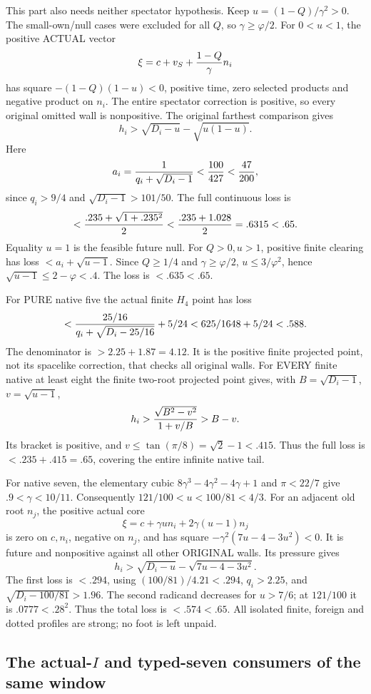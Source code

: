 \documentclass[11pt]{article}
\begin{document}
This part also needs neither spectator
hypothesis.  Keep
\(u=(1-Q)/\gamma^2>0\).
The small-own/null cases were excluded for
all \(Q\), so \(\gamma\ge\varphi/2\).
For \(0<u<1\), the positive ACTUAL vector
\[
        \xi=c+v_S+{1-Q\over\gamma}n_i
\]
has square \(-(1-Q)(1-u)<0\), positive
time, zero selected products and negative
product on \(n_i\).
The entire spectator correction is positive,
so every original omitted wall is nonpositive.
The original farthest comparison gives
\[
 h_i>\sqrt{D_i-u}-\sqrt{u(1-u)} .
\]
Here
\[
 a_i={1\over q_i+\sqrt{D_i-1}}<{100\over427}<{47\over200},
\]
since \(q_i>9/4\) and
\(\sqrt{D_i-1}>101/50\).
The full continuous loss is
\[
 <{.235+\sqrt{1+.235^2}\over2}
 <{.235+1.028\over2}=.6315<.65 .
\]
Equality \(u=1\) is the feasible future null.
For \(Q>0,u>1\), positive finite clearing
has loss \(<a_i+\sqrt{u-1}\).
Since \(Q\ge1/4\) and \(\gamma\ge\varphi/2\),
\(u\le3/\varphi^2\), hence
\(\sqrt{u-1}\le2-\varphi<.4\).
The loss is \(<.635<.65\).

For PURE native five the actual finite
\(H_4\) point has loss
\[
 <{25/16\over q_i+\sqrt{D_i-25/16}}+5/24
              <625/1648+5/24<.588 .
\]
The denominator is \(>2.25+1.87=4.12\).
It is the positive finite projected point,
not its spacelike correction, that checks
all original walls.
For EVERY finite native at least eight
the finite two-root projected point gives,
with \(B=\sqrt{D_i-1}\), \(v=\sqrt{u-1}\),
\[
 h_i>{\sqrt{B^2-v^2}\over1+v/B}>B-v .
\]
Its bracket is positive, and
\(v\le\tan(\pi/8)=\sqrt2-1<.415\).
Thus the full loss is \(<.235+.415=.65\),
covering the entire infinite native tail.

For native seven, the elementary cubic
\(8\gamma^3-4\gamma^2-4\gamma+1\) and
\(\pi<22/7\) give \(.9<\gamma<10/11\).
Consequently \(121/100<u<100/81<4/3\).
For an adjacent old root \(n_j\), the
positive actual core
\[
             \xi=c+\gamma un_i+2\gamma(u-1)n_j
\]
is zero on \(c,n_i\), negative on \(n_j\),
and has square
\(-\gamma^2(7u-4-3u^2)<0\).
It is future and nonpositive against all
other ORIGINAL walls.
Its pressure gives
\[
 h_i>\sqrt{D_i-u}-\sqrt{7u-4-3u^2}.
\]
The first loss is \(<.294\), using
\((100/81)/4.21<.294\),
\(q_i>2.25\), and
\(\sqrt{D_i-100/81}>1.96\).
The second radicand decreases for \(u>7/6\);
at \(121/100\) it is \(.0777<.28^2\).
Thus the total loss is \(<.574<.65\).
All isolated finite, foreign and dotted
profiles are strong; no foot is left unpaid.

\subsection{The actual-\(I\) and typed-seven consumers of the same window}
\label{app:arithA10consumers}
\end{document}

